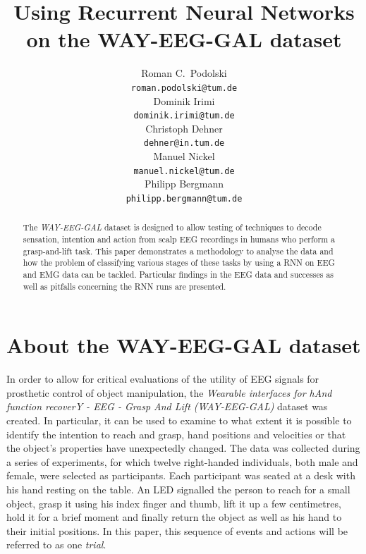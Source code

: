 \documentclass{article} %
\title{Using Recurrent Neural Networks on the WAY-EEG-GAL dataset}
\author{
Roman C.~Podolski
\\
\texttt{roman.podolski@tum.de} \\
\And
Dominik Irimi \\
\texttt{dominik.irimi@tum.de} \\
\AND
Christoph Dehner \\
\texttt{dehner@in.tum.de} \\
\And
Manuel Nickel \\
\texttt{manuel.nickel@tum.de} \\
\And
Philipp Bergmann \\
\texttt{philipp.bergmann@tum.de} \\
}
\begin{document}
\maketitle

\begin{abstract}
The \emph{WAY-EEG-GAL} dataset is designed to allow testing of techniques to decode sensation, intention and action from scalp EEG recordings in humans who perform a grasp-and-lift task. This paper demonstrates a methodology to analyse the data and how the problem of classifying various stages of these tasks by using a RNN on EEG and EMG data can be tackled. Particular findings in the EEG data and successes as well as pitfalls concerning the RNN runs are presented.
\end{abstract}

\section{About the WAY-EEG-GAL dataset}\label{sec:data}
In order to allow for critical evaluations of the utility of EEG signals for prosthetic control of object manipulation, the \emph{Wearable interfaces for hAnd function recoverY - EEG - Grasp And Lift (WAY-EEG-GAL)} dataset was created. In particular, it can be used to examine to what extent it is possible to identify the intention to reach and grasp, hand positions and velocities or that the object's properties have unexpectedly changed. The data was collected during a series of experiments, for which twelve right-handed individuals, both male and female, were selected as participants. Each participant was seated at a desk with his hand resting on the table. An LED signalled the person to reach for a small object, grasp it using his index finger and thumb, lift it up a few centimetres, hold it for a brief moment and finally return the object as well as his hand to their initial positions. In this paper, this sequence of events and actions will be referred to as one \emph{trial}.
\end{document}
